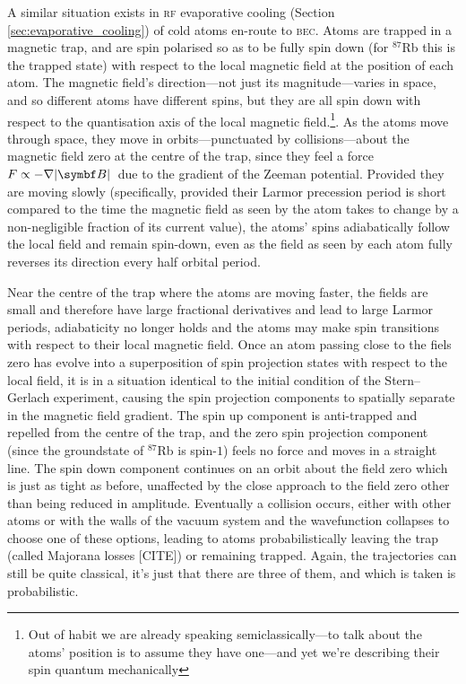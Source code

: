 A similar situation exists in \textsc{rf} evaporative cooling (Section \ref{sec:evaporative_cooling}) of cold atoms en-route to \textsc{bec}. Atoms are trapped in a magnetic trap, and are spin polarised so as to be fully spin down (for $^{87}$Rb this is the trapped state) with respect to the local magnetic field at the position of each atom. The magnetic field's direction---not just  its magnitude---varies in space, and so different atoms have different spins, but they are all spin down with respect to the quantisation axis of the local magnetic field.\footnote{Out of habit we are already speaking semiclassically---to talk about the atoms' position is to assume they have one---and yet we're describing their spin quantum mechanically}. As the atoms move through space, they move in orbits---punctuated by collisions---about the magnetic field zero at the centre of the trap, since they feel a force $F\propto-\nabla\abs{\vec B}$ due to the gradient of the Zeeman potential. Provided they are moving slowly (specifically, provided their Larmor precession period is short compared to the time the magnetic field as seen by the atom takes to change by a non-negligible fraction of its current value), the atoms' spins adiabatically follow the local field and remain spin-down, even as the field as seen by each atom fully reverses its direction every half orbital period.

Near the centre of the trap where the atoms are moving faster, the fields are small and therefore have large fractional derivatives and lead to large Larmor periods, adiabaticity no longer holds and the atoms may make spin transitions with respect to their local magnetic field. Once an atom passing close to the fiels zero has evolve into a superposition of spin projection states with respect to the local field, it is in a situation identical to the initial condition of the Stern--Gerlach experiment, causing the spin projection components to spatially separate in the magnetic field gradient. The spin up component is anti-trapped and repelled from the centre of the trap, and the zero spin projection component (since the groundstate of $^{87}$Rb is spin-$1$) feels no force and moves in a straight line. The spin down component continues on an orbit about the field zero which is just as tight as before, unaffected by the close approach to the field zero other than being reduced in amplitude. Eventually a collision occurs, either with other atoms or with the walls of the vacuum system and the wavefunction collapses to choose one of these options, leading to atoms probabilistically leaving the trap (called Majorana losses [CITE]) or remaining trapped. Again, the trajectories can still be quite classical, it's just that there are three of them, and which is taken is probabilistic.

